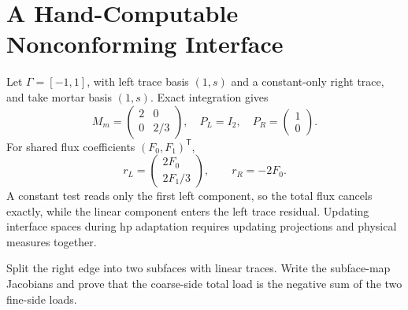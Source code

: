 \section{A Hand-Computable Nonconforming Interface}
Let $\Gamma=[-1,1]$, with left trace basis $(1,s)$ and a constant-only right trace, and take mortar basis $(1,s)$. Exact integration gives
\[
M_m=\begin{pmatrix}2&0\\0&2/3\end{pmatrix},\quad
P_L=I_2,\quad P_R=\begin{pmatrix}1\\0\end{pmatrix}.
\]
For shared flux coefficients $(F_0,F_1)^{\mathsf T}$,
\[
r_L=\begin{pmatrix}2F_0\\2F_1/3\end{pmatrix},\qquad r_R=-2F_0.
\]
A constant test reads only the first left component, so the total flux cancels exactly, while the linear component enters the left trace residual. Updating interface spaces during hp adaptation requires updating projections and physical measures together.

{Split the right edge into two subfaces with linear traces. Write the subface-map Jacobians and prove that the coarse-side total load is the negative sum of the two fine-side loads.}
